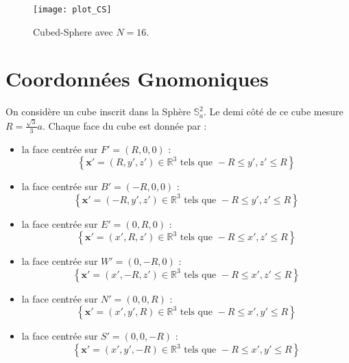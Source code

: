\begin{figure}
\begin{center}
\texttt{[image: plot\_CS]}
\end{center}
\caption{Cubed-Sphere avec $N=16$.}
\end{figure}

















\section{Coordonnées Gnomoniques}

On considère un cube inscrit dans la Sphère $\mathbb{S}_a^2$. Le demi côté de ce cube mesure $R=\frac{\sqrt{3}}{3}a$. Chaque face du cube est donnée par :
\begin{itemize}
\item la face centrée sur $F'=(R,0,0)$ : 
\begin{equation}
\left\lbrace
\mathbf{x}' = (R,y',z') \in \mathbb{R}^3 \text{ tels que } -R  \leq y',z' \leq R
\right\rbrace
\end{equation}

\item la face centrée sur $B'=(-R,0,0)$ : 
\begin{equation}
\left\lbrace
\mathbf{x}' = (-R,y',z') \in \mathbb{R}^3 \text{ tels que } -R  \leq y',z' \leq R
\right\rbrace
\end{equation}

\item la face centrée sur $E'=(0,R,0)$ : 
\begin{equation}
\left\lbrace
\mathbf{x}' = (x',R,z') \in \mathbb{R}^3 \text{ tels que } -R  \leq x',z' \leq R
\right\rbrace
\end{equation}

\item la face centrée sur $W'=(0,-R,0)$ : 
\begin{equation}
\left\lbrace
\mathbf{x}' = (x',-R,z') \in \mathbb{R}^3 \text{ tels que } -R  \leq x',z' \leq R
\right\rbrace
\end{equation}

\item la face centrée sur $N'=(0,0,R)$ : 
\begin{equation}
\left\lbrace
\mathbf{x}' = (x',y',R) \in \mathbb{R}^3 \text{ tels que } -R  \leq x',y' \leq R
\right\rbrace
\end{equation}

\item la face centrée sur $S'=(0,0,-R)$ : 
\begin{equation}
\left\lbrace
\mathbf{x}' = (x',y',-R) \in \mathbb{R}^3 \text{ tels que } -R  \leq x',y' \leq R
\right\rbrace
\end{equation}
\end{itemize}

